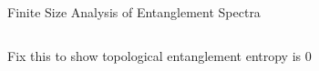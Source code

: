 \begin{block}{Finite Size Analysis of Entanglement Spectra}
\begin{columns}[T]
\begin{column}{.5\textwidth}
        \begin{figure}[hbctp]
        \centering
        \texttt{[image: \{EntanglementEnergyScaling.pdf]}}
        \end{figure}
\end{column}
\begin{column}{.5\textwidth}
\bi
\item Fix this to show topological entanglement entropy is 0
\ei
\end{column}
\end{columns}


\end{block}